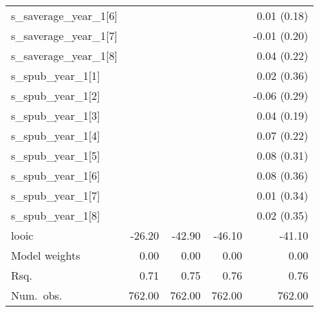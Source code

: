 \begin{center}
\begin{longtable}{l D{)}{)}{9)3} D{)}{)}{9)3} D{)}{)}{9)3} D{)}{)}{9)3}}
s\_saverage\_year\_1[6]     &                       &                       &                       & 0.01 \; (0.18)        \\
s\_saverage\_year\_1[7]     &                       &                       &                       & -0.01 \; (0.20)       \\
s\_saverage\_year\_1[8]     &                       &                       &                       & 0.04 \; (0.22)        \\
s\_spub\_year\_1[1]         &                       &                       &                       & 0.02 \; (0.36)        \\
s\_spub\_year\_1[2]         &                       &                       &                       & -0.06 \; (0.29)       \\
s\_spub\_year\_1[3]         &                       &                       &                       & 0.04 \; (0.19)        \\
s\_spub\_year\_1[4]         &                       &                       &                       & 0.07 \; (0.22)        \\
s\_spub\_year\_1[5]         &                       &                       &                       & 0.08 \; (0.31)        \\
s\_spub\_year\_1[6]         &                       &                       &                       & 0.08 \; (0.36)        \\
s\_spub\_year\_1[7]         &                       &                       &                       & 0.01 \; (0.34)        \\
s\_spub\_year\_1[8]         &                       &                       &                       & 0.02 \; (0.35)        \\
\midrule
looic                       & -26.20                & -42.90                & -46.10                & -41.10                \\
Model weights               & 0.00                  & 0.00                  & 0.00                  & 0.00                  \\
Rsq.                        & 0.71                  & 0.75                  & 0.76                  & 0.76                  \\
Num.\ obs.                  & 762.00                & 762.00                & 762.00                & 762.00                \\
\end{longtable}
\end{center}
